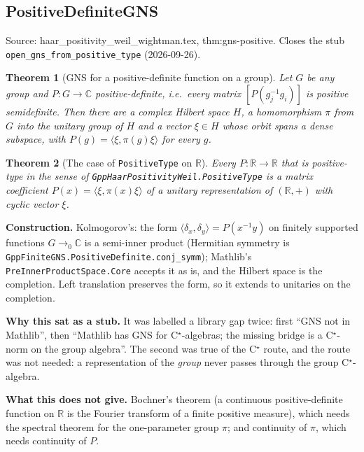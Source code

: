 \documentclass{report}
\newtheorem{theorem}{Theorem}[chapter]
\theoremstyle{definition}
\begin{document}
\subsection{PositiveDefiniteGNS}
Source: haar\_positivity\_weil\_wightman.tex, thm:gns-positive. Closes the stub
\texttt{open\_gns\_from\_positive\_type} (2026-09-26).

\begin{theorem}[GNS for a positive-definite function on a group]\label{thm:gns-positive-definite}
\leanok
Let $G$ be any group and $P : G \to \mathbb{C}$ positive-definite, i.e.\ every matrix
$[P(g_j^{-1} g_i)]$ is positive semidefinite. Then there are a complex Hilbert space $H$, a
homomorphism $\pi$ from $G$ into the unitary group of $H$ and a vector $\xi \in H$ whose orbit
spans a dense subspace, with $P(g) = \langle \xi, \pi(g)\xi\rangle$ for every $g$.
\end{theorem}

\begin{theorem}[The case of \texttt{PositiveType} on $\mathbb{R}$]\label{thm:gns-positive-type}
\leanok
{}
Every $P : \mathbb{R}\to\mathbb{R}$ that is positive-type in the sense of
\texttt{GppHaarPositivityWeil.PositiveType} is a matrix coefficient
$P(x) = \langle \xi, \pi(x)\xi\rangle$ of a unitary representation of $(\mathbb{R},+)$ with
cyclic vector $\xi$.
\end{theorem}

\noindent\textbf{Construction.} Kolmogorov's: the form
$\langle \delta_x, \delta_y\rangle = P(x^{-1}y)$ on finitely supported functions
$G \to_0 \mathbb{C}$ is a semi-inner product (Hermitian symmetry is
\texttt{GppFiniteGNS.PositiveDefinite.conj\_symm}); Mathlib's
\texttt{PreInnerProductSpace.Core} accepts it as is, and the Hilbert space is the completion.
Left translation preserves the form, so it extends to unitaries on the completion.

\noindent\textbf{Why this sat as a stub.} It was labelled a library gap twice: first ``GNS not in
Mathlib'', then ``Mathlib has GNS for C$^\star$-algebras; the missing bridge is a C$^\star$-norm on
the group algebra''. The second was true of the C$^\star$ route, and the route was not needed: a
representation of the \emph{group} never passes through the group C$^\star$-algebra.

\noindent\textbf{What this does not give.} Bochner's theorem (a continuous positive-definite
function on $\mathbb{R}$ is the Fourier transform of a finite positive measure), which needs the
spectral theorem for the one-parameter group $\pi$; and continuity of $\pi$, which needs
continuity of $P$.
\end{document}
